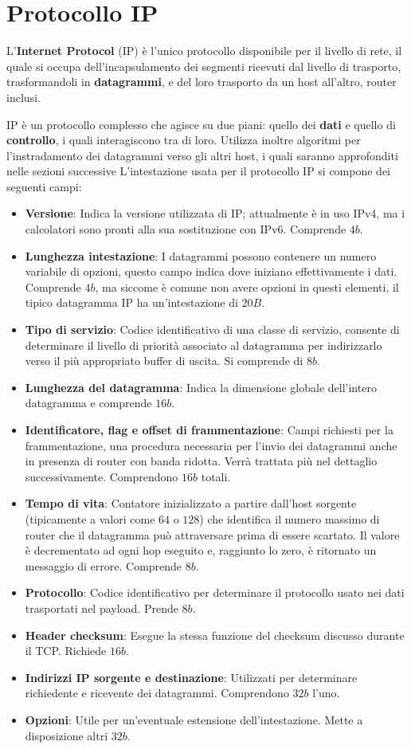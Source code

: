 \section{Protocollo IP}
L'\textbf{Internet Protocol} (IP) è l'unico protocollo disponibile per il livello di rete, il quale si occupa dell'incapsulamento dei segmenti ricevuti
dal livello di trasporto, trasformandoli in \textbf{datagrammi}, e del loro trasporto da un host all'altro, router inclusi.\par
IP è un protocollo complesso che agisce su due piani: quello dei \textbf{dati} e quello di \textbf{controllo}, i quali interagiscono tra di loro.
Utilizza inoltre algoritmi per l'instradamento dei datagrammi verso gli altri host, i quali saranno approfonditi nelle sezioni successive
L'intestazione usata per il protocollo IP si compone dei seguenti campi: \begin{itemize}
	\item \textbf{Versione}: Indica la versione utilizzata di IP; attualmente è in uso IPv4, ma i calcolatori sono pronti alla sua sostituzione con
	IPv6. Comprende $4b$.
	\item \textbf{Lunghezza intestazione}: I datagrammi possono contenere un numero variabile di opzioni, questo campo indica dove iniziano effettivamente
	i dati. Comprende $4b$, ma siccome è comune non avere opzioni in questi elementi, il tipico datagramma IP ha un'intestazione di $20B$.
	\item \textbf{Tipo di servizio}: Codice identificativo di una classe di servizio, consente di determinare il livello di priorità associato al
	datagramma per indirizzarlo verso il più appropriato buffer di uscita. Si comprende di $8b$.
	\item \textbf{Lunghezza del datagramma}: Indica la dimensione globale dell'intero datagramma e comprende $16b$.
	\item \textbf{Identificatore, flag e offset di frammentazione}: Campi richiesti per la frammentazione, una procedura necessaria per l'invio dei
	datagrammi anche in presenza di router con banda ridotta. Verrà trattata più nel dettaglio successivamente. Comprendono $16b$ totali.
	\item \textbf{Tempo di vita}: Contatore inizializzato a partire dall'host sorgente (tipicamente a valori come $64$ o $128$) che identifica il
	numero massimo di router che il datagramma può attraversare prima di essere scartato. Il valore è decrementato ad ogni hop eseguito e, raggiunto lo
	zero, è ritornato un messaggio di errore. Comprende $8b$.
	\item \textbf{Protocollo}: Codice identificativo per determinare il protocollo usato nei dati trasportati nel payload. Prende $8b$.
	\item \textbf{Header checksum}: Esegue la stessa funzione del checksum discusso durante il TCP. Richiede $16b$.
	\item \textbf{Indirizzi IP sorgente e destinazione}: Utilizzati per determinare richiedente e ricevente dei datagrammi. Comprendono $32b$ l'uno.
	\item \textbf{Opzioni}: Utile per un'eventuale estensione dell'intestazione. Mette a disposizione altri $32b$.
\end{itemize}


